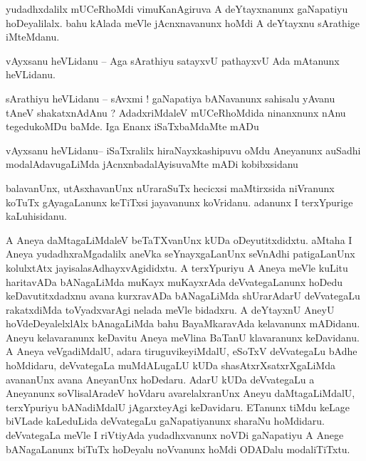 \documentclass{article}
\begin{document}
\begin{mng}%
yudadhxdalilx mUCeRhoMdi vimuKanAgiruva A deYtayxnanunx gaNapatiyu hoDeyalilalx. bahu kAlada meVle jAcnxnavanunx hoMdi A deYtayxnu sArathige iMteMdanu.
\end{mng}

\begin{mng}%
vAyxsanu heVLidanu -- Aga sArathiyu satayxvU pathayxvU Ada mAtanunx heVLidanu.
\end{mng}

\begin{mng}%
sArathiyu heVLidanu -- sAvxmi ! gaNapatiya bANavanunx sahisalu yAvanu tAneV shakatxnAdAnu ? 
AdadxriMdaleV mUCeRhoMdida ninanxnunx nAnu tegedukoMDu baMde. Iga Enanx iSaTxbaMdaMte mADu
\end{mng}

\begin{mng}%
vAyxsanu heVLidanu-- iSaTxralilx hiraNayxkashipuvu oMdu Aneyanunx auSadhi modalAdavugaLiMda 
jAcnxnbadalAyisuvaMte mADi kobibxsidanu
\end{mng}

\begin{mng}%
balavanUnx, utAsxhavanUnx nUraraSuTx hecicxsi maMtirxsida niVranunx koTuTx gAyagaLanunx keTiTxsi 
jayavanunx koVridanu. adanunx I terxYpurige kaLuhisidanu.
\end{mng}

\begin{mng}%
A Aneya daMtagaLiMdaleV beTaTXvanUnx kUDa oDeyutitxdidxtu. aMtaha I Aneya yudadhxraMgadalilx aneVka 
seYnayxgaLanUnx seVnAdhi patigaLanUnx kolulxtAtx jayisalasAdhayxvAgididxtu. A terxYpuriyu A Aneya 
meVle kuLitu haritavADa bANagaLiMda muKayx muKayxrAda deVvategaLanunx hoDedu keDavutitxdadxnu 
avana kurxravADa bANagaLiMda shUrarAdarU deVvategaLu rakatxdiMda toVyadxvarAgi nelada meVle 
bidadxru. A deYtayxnU AneyU hoVdeDeyalelxlAlx bAnagaLiMda bahu BayaMkaravAda kelavanunx mADidanu. 
Aneyu kelavaranunx keDavitu Aneya meVlina BaTanU klavaranunx keDavidanu. A Aneya veVgadiMdalU, 
adara tiruguvikeyiMdalU, eSoTxV deVvategaLu bAdhe hoMdidaru, deVvategaLa muMdALugaLU kUDa 
shasAtxrXsatxrXgaLiMda avananUnx avana AneyanUnx hoDedaru. AdarU kUDa deVvategaLu a Aneyanunx 
soVlisalAradeV hoVdaru avarelalxranUnx Aneyu daMtagaLiMdalU, terxYpuriyu bANadiMdalU jAgarxteyAgi 
keDavidaru. ETanunx tiMdu keLage biVLade kaLeduLida deVvategaLu gaNapatiyanunx sharaNu hoMdidaru. 
deVvategaLa meVle I riVtiyAda yudadhxvanunx noVDi gaNapatiyu A Anege bANagaLanunx biTuTx hoDeyalu 
noVvanunx hoMdi ODADalu modaliTiTxtu.
\end{mng}
\end{document}

